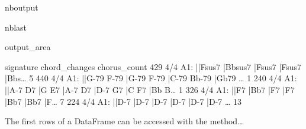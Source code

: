 \documentclass[letterpaper,10pt,english]{sphinxmanual}
\begin{document}
\begin{sphinxuseclass}{nboutput}
\begin{sphinxuseclass}{nblast}
{\begin{sphinxuseclass}{output_area}
\begin{sphinxuseclass}{}
\begin{sphinxVerbatim}[commandchars=\\\{\}]
    signature                                      chord\_changes  chorus\_count
429       4/4  A1: ||Fsus7   |Bbsus7   |Fsus7   |Fsus7   |Bbs{\ldots}             5
440       4/4  A1: ||G-79 F-79 |G-79 F-79 |C-79 Bb-79 |Gb79  {\ldots}             1
240       4/4  A1: ||A-7 D7 |G E7 |A-7 D7 |D-7 G7 |C F7 |Bb B{\ldots}             1
326       4/4  A1: ||F7   |Bb7   |F7   |F7   |Bb7   |Bb7   |F{\ldots}             7
224       4/4  A1: ||D-7   |D-7   |D-7   |D-7   |D-7   |D-7  {\ldots}            13
\end{sphinxVerbatim}



\end{sphinxuseclass}
\end{sphinxuseclass}
}

\end{sphinxuseclass}
\end{sphinxuseclass}
\sphinxAtStartPar
The first rows of a DataFrame can be accessed with the  method…
\end{document}

